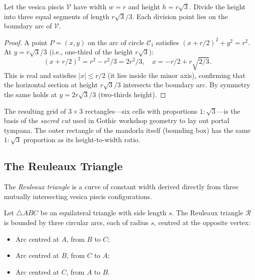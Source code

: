\begin{proposition}\label{prop:mandorla}
Let the vesica piscis \(\mathcal{V}\) have width \(w = r\) and
height \(h = r\sqrt{3}\).
Divide the height into three equal segments of length \(r\sqrt{3}/3\).
Each division point lies on the boundary arc of \(\mathcal{V}\).
\end{proposition}

\begin{proof}
A point \(P = (x, y)\) on the arc of circle \(\mathcal{C}_1\) satisfies
\((x + r/2)^2 + y^2 = r^2\).
At \(y = r\sqrt{3}/3\) (i.e., one-third of the height \(r\sqrt{3}\)):
\[
  (x + r/2)^2 = r^2 - r^2/3 = 2r^2/3,
  \quad
  x = -r/2 + r\sqrt{2/3}.
\]
This is real and satisfies \(|x| \leq r/2\) (it lies inside the minor
axis), confirming that the horizontal section at height \(r\sqrt{3}/3\)
intersects the boundary arc.
By symmetry the same holds at \(y = 2r\sqrt{3}/3\) (two-thirds height).
\end{proof}

The resulting grid of \(3 \times 3\) rectangles—six cells with proportions
\(1 : \sqrt{3}\)—is the basis of the \emph{sacred cut} used in Gothic
workshop geometry to lay out portal tympana.
The outer rectangle of the mandorla itself (bounding box) has the same
\(1:\sqrt{3}\) proportion as its height-to-width ratio.

\subsection{The Reuleaux Triangle}
\label{subsec:ch11-reuleaux}

The \emph{Reuleaux triangle} is a curve of constant width derived directly
from three mutually intersecting vesica piscis configurations.

\begin{definition}\label{def:reuleaux}
Let \(\triangle ABC\) be an equilateral triangle with side length \(s\).
The Reuleaux triangle \(\mathcal{R}\) is bounded by three circular arcs,
each of radius \(s\), centred at the opposite vertex:
\begin{itemize}
\item Arc centred at \(A\), from \(B\) to \(C\);
\item Arc centred at \(B\), from \(C\) to \(A\);
\item Arc centred at \(C\), from \(A\) to \(B\).
\end{itemize}
\end{definition}


